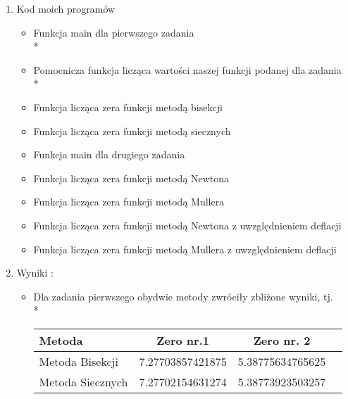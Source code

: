 \documentclass[a4paper, 11pt]{article}
\begin{document}
\begin{enumerate}
\item Kod moich programów 
\begin{itemize}
\item Funkcja main dla pierwszego zadania \\*

\item Pomocnicza funkcja licząca wartości naszej funkcji podanej dla zadania \\*
 
 \item Funkcja licząca zera funkcji metodą bisekcji
 
 \item Funkcja licząca zera funkcji metodą siecznych
 
  \item Funkcja main dla drugiego zadania
 
   \item Funkcja licząca zera funkcji metodą Newtona
 
   \item Funkcja licząca zera funkcji metodą Mullera
 
    \item Funkcja licząca zera funkcji metodą Newtona z uwzględnieniem deflacji
 
   \item Funkcja licząca zera funkcji metodą Mullera z uwzględnieniem deflacji
 
\end{itemize}
\item
Wyniki : 
\begin{itemize}
\item  Dla zadania pierwszego obydwie metody zwróciły zbliżone wyniki, tj.\\*
\begin{center}

	\begin{tabular}{ l*{2}{c}r}
  \hline	
	Metoda & Zero nr.1 & Zero nr. 2 \\ \hline
    Metoda Bisekcji & 7.27703857421875	& 5.38775634765625	\\
    Metoda Siecznych & 7.27702154631274	& 5.38773923503257 \\
  \hline
  \end{tabular}
\begin{table}[p]                                                                  
\centering                                                                       
\begin{tabular}{|c|c|c|c|c|c|c|c|c|}                                             
\hline                                                                           
                                                                        

\end{tabular}
\end{table}
\end{center}
\end{itemize}
\end{enumerate}
\end{document}
